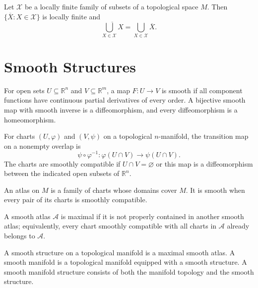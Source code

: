 \begin{lemma}
\label{lem:1-13}
\mathlibok
{}
Let $\mathcal X$ be a locally finite family of subsets of a topological space
$M$. Then $\{\overline X:X\in\mathcal X\}$ is locally finite and
\[
\overline{\bigcup_{X\in\mathcal X}X}
=\bigcup_{X\in\mathcal X}\overline X.
\]
\end{lemma}



\section{Smooth Structures}

\begin{definition}
\label{def:1-2-extra-1}
\mathlibok
For open sets $U\subseteq\mathbb R^n$ and $V\subseteq\mathbb R^m$, a map
$F:U\to V$ is smooth if all component functions have continuous partial
derivatives of every order. A bijective smooth map with smooth inverse is a
diffeomorphism, and every diffeomorphism is a homeomorphism.
\end{definition}

\begin{definition}
\label{def:1-2-extra-2}
\mathlibok
For charts $(U,\varphi)$ and $(V,\psi)$ on a topological $n$-manifold, the
transition map on a nonempty overlap is
\[
\psi\circ\varphi^{-1}:\varphi(U\cap V)\longrightarrow\psi(U\cap V).
\]
The charts are smoothly compatible if $U\cap V=\varnothing$ or this map is a
diffeomorphism between the indicated open subsets of $\mathbb R^n$.
\end{definition}

\begin{definition}
\label{def:1-2-extra-3}
\leanok
An atlas on $M$ is a family of charts whose domains cover $M$. It is smooth
when every pair of its charts is smoothly compatible.
\end{definition}

\begin{definition}
\label{def:1-2-extra-4}
\mathlibok
A smooth atlas $\mathcal A$ is maximal if it is not properly contained in
another smooth atlas; equivalently, every chart smoothly compatible with all
charts in $\mathcal A$ already belongs to $\mathcal A$.
\end{definition}

\begin{definition}
\label{def:1-2-extra-5}
\leanok
A smooth structure on a topological manifold is a maximal smooth atlas. A
smooth manifold is a topological manifold equipped with a smooth structure.
A smooth manifold structure consists of both the manifold topology and the
smooth structure.
\end{definition}


